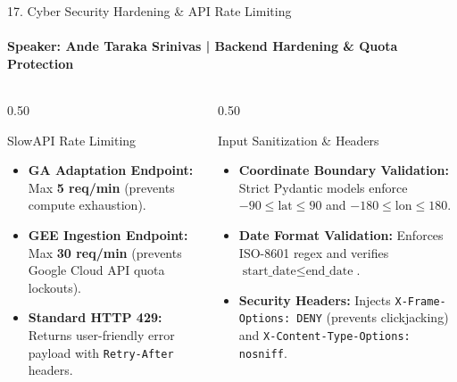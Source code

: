 \documentclass[aspectratio=169, 11pt]{beamer}
\begin{document}
\begin{frame}{17. Cyber Security Hardening \& API Rate Limiting}
    \framesubtitle{\textbf{\textcolor{amritaGold}{Speaker: Ande Taraka Srinivas}} \quad | \quad Backend Hardening \& Quota Protection}
    \begin{columns}[c]
        \begin{column}{0.50\textwidth}
            \begin{block}{SlowAPI Rate Limiting}
                \small
                \begin{itemize}
                    \item \textbf{GA Adaptation Endpoint:} Max \textbf{5 req/min} (prevents compute exhaustion).
                    \item \textbf{GEE Ingestion Endpoint:} Max \textbf{30 req/min} (prevents Google Cloud API quota lockouts).
                    \item \textbf{Standard HTTP 429:} Returns user-friendly error payload with \texttt{Retry-After} headers.
                \end{itemize}
            \end{block}
        \end{column}
        \begin{column}{0.50\textwidth}
            \begin{exampleblock}{Input Sanitization \& Headers}
                \small
                \begin{itemize}
                    \item \textbf{Coordinate Boundary Validation:} Strict Pydantic models enforce $-90 \le \text{lat} \le 90$ and $-180 \le \text{lon} \le 180$.
                    \item \textbf{Date Format Validation:} Enforces ISO-8601 regex and verifies $\text{start\_date} \le \text{end\_date}$.
                    \item \textbf{Security Headers:} Injects \texttt{X-Frame-Options: DENY} (prevents clickjacking) and \texttt{X-Content-Type-Options: nosniff}.
                \end{itemize}
            \end{exampleblock}
        \end{column}
    \end{columns}
\end{frame}
\end{document}
